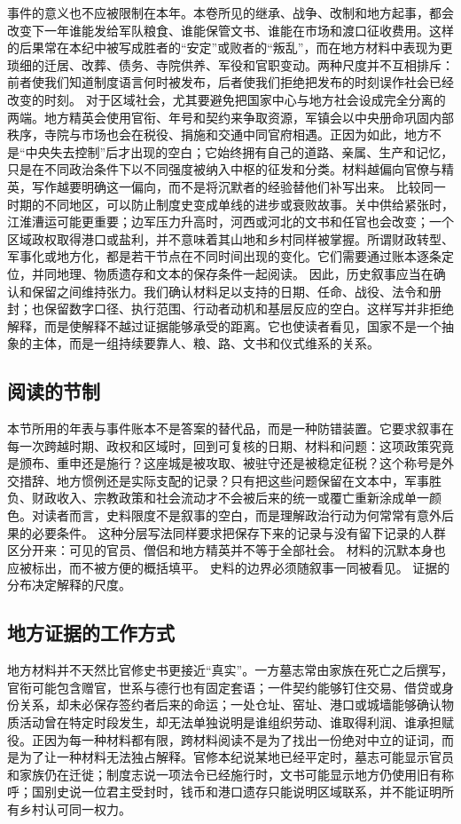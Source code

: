事件的意义也不应被限制在本年。本卷所见的继承、战争、改制和地方起事，都会改变下一年谁能发给军队粮食、谁能保管文书、谁能在市场和渡口征收费用。这样的后果常在本纪中被写成胜者的“安定”或败者的“叛乱”，而在地方材料中表现为更琐细的迁居、改葬、债务、寺院供养、军役和官职变动。两种尺度并不互相排斥：前者使我们知道制度语言何时被发布，后者使我们拒绝把发布的时刻误作社会已经改变的时刻。  对于区域社会，尤其要避免把国家中心与地方社会设成完全分离的两端。地方精英会使用官衔、年号和契约来争取资源，军镇会以中央册命巩固内部秩序，寺院与市场也会在税役、捐施和交通中同官府相遇。正因为如此，地方不是“中央失去控制”后才出现的空白；它始终拥有自己的道路、亲属、生产和记忆，只是在不同政治条件下以不同强度被纳入中枢的征发和分类。材料越偏向官僚与精英，写作越要明确这一偏向，而不是将沉默者的经验替他们补写出来。  比较同一时期的不同地区，可以防止制度史变成单线的进步或衰败故事。关中供给紧张时，江淮漕运可能更重要；边军压力升高时，河西或河北的文书和任官也会改变；一个区域政权取得港口或盐利，并不意味着其山地和乡村同样被掌握。所谓财政转型、军事化或地方化，都是若干节点在不同时间出现的变化。它们需要通过账本逐条定位，并同地理、物质遗存和文本的保存条件一起阅读。  因此，历史叙事应当在确认和保留之间维持张力。我们确认材料足以支持的日期、任命、战役、法令和册封；也保留数字口径、执行范围、行动者动机和基层反应的空白。这样写并非拒绝解释，而是使解释不越过证据能够承受的距离。它也使读者看见，国家不是一个抽象的主体，而是一组持续要靠人、粮、路、文书和仪式维系的关系。  \subsection{阅读的节制} 本节所用的年表与事件账本不是答案的替代品，而是一种防错装置。它要求叙事在每一次跨越时期、政权和区域时，回到可复核的日期、材料和问题：这项政策究竟是颁布、重申还是施行？这座城是被攻取、被驻守还是被稳定征税？这个称号是外交措辞、地方惯例还是实际支配的记录？只有把这些问题保留在文本中，军事胜负、财政收入、宗教政策和社会流动才不会被后来的统一或覆亡重新涂成单一颜色。对读者而言，史料限度不是叙事的空白，而是理解政治行动为何常常有意外后果的必要条件。   \noindent 这种分层写法同样要求把保存下来的记录与没有留下记录的人群区分开来：可见的官员、僧侣和地方精英并不等于全部社会。  材料的沉默本身也应被标出，而不被方便的概括填平。  史料的边界必须随叙事一同被看见。  证据的分布决定解释的尺度。  \subsection{地方证据的工作方式} 地方材料并不天然比官修史书更接近“真实”。一方墓志常由家族在死亡之后撰写，官衔可能包含赠官，世系与德行也有固定套语；一件契约能够钉住交易、借贷或身份关系，却未必保存签约者后来的命运；一处仓址、窑址、港口或城墙能够确认物质活动曾在特定时段发生，却无法单独说明是谁组织劳动、谁取得利润、谁承担赋役。正因为每一种材料都有限，跨材料阅读不是为了找出一份绝对中立的证词，而是为了让一种材料无法独占解释。官修本纪说某地已经平定时，墓志可能显示官员和家族仍在迁徙；制度志说一项法令已经施行时，文书可能显示地方仍使用旧有称呼；国别史说一位君主受封时，钱币和港口遗存只能说明区域联系，并不能证明所有乡村认可同一权力。  